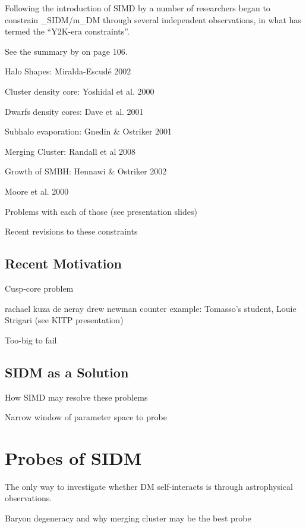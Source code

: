 Following the introduction of SIMD by \citet{Spergel:2000cb} a number of researchers began to constrain \sigma_{\rm SIDM}/m_{\rm DM} through several independent observations, in what \citet{Peter:2012vi} has termed the ``Y2K-era constraints''.

See the summary by \citet{Peter:2012vi} on page 106.

Halo Shapes: Miralda-Escudé 2002

Cluster density core: Yoshidal et al. 2000

Dwarfs density cores: Dave et al. 2001

Subhalo evaporation: Gnedin \& Ostriker 2001

Merging Cluster: Randall et al 2008

Growth of SMBH: Hennawi \& Ostriker 2002

Moore et al. 2000 \citep{Moore:2000ee}

Problems with each of those (see presentation slides)

Recent revisions to these constraints \citep{Peter:2012vi}

\subsection{Recent Motivation}

Cusp-core problem

	rachael kuza de neray
	drew newman
	counter example: Tomasso's student, Louie Strigari (see KITP presentation)

Too-big to fail

\subsection{SIDM as a Solution}

How SIMD may resolve these problems

Narrow window of parameter space to probe \citep{Rocha:2012tr}

\section{Probes of SIDM}

The only way to investigate whether DM self-interacts is through astrophysical observations.

Baryon degeneracy and why merging cluster may be the best probe

